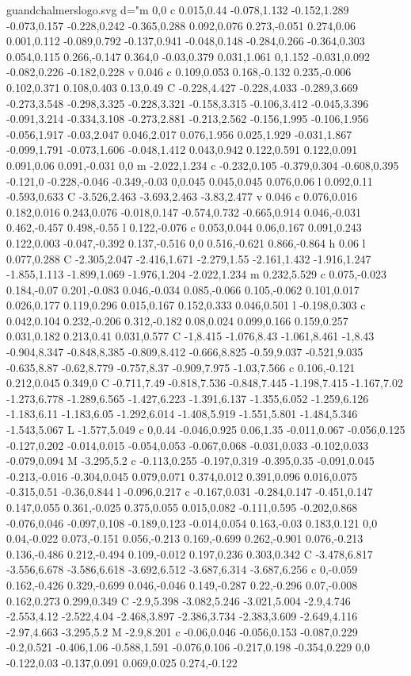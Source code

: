 \begin{filecontents}[noheader]{guandchalmerslogo.svg}
			   d="m 0,0 c 0.015,0.44 -0.078,1.132 -0.152,1.289 -0.073,0.157 -0.228,0.242 -0.365,0.288 0.092,0.076 0.273,-0.051 0.274,0.06 0.001,0.112 -0.089,0.792 -0.137,0.941 -0.048,0.148 -0.284,0.266 -0.364,0.303 0.054,0.115 0.266,-0.147 0.364,0 -0.03,0.379 0.031,1.061 0,1.152 -0.031,0.092 -0.082,0.226 -0.182,0.228 v 0.046 c 0.109,0.053 0.168,-0.132 0.235,-0.006 0.102,0.371 0.108,0.403 0.13,0.49 C -0.228,4.427 -0.228,4.033 -0.289,3.669 -0.273,3.548 -0.298,3.325 -0.228,3.321 -0.158,3.315 -0.106,3.412 -0.045,3.396 -0.091,3.214 -0.334,3.108 -0.273,2.881 -0.213,2.562 -0.156,1.995 -0.106,1.956 -0.056,1.917 -0.03,2.047 0.046,2.017 0.076,1.956 0.025,1.929 -0.031,1.867 -0.099,1.791 -0.073,1.606 -0.048,1.412 0.043,0.942 0.122,0.591 0.122,0.091 0.091,0.06 0.091,-0.031 0,0 m -2.022,1.234 c -0.232,0.105 -0.379,0.304 -0.608,0.395 -0.121,0 -0.228,-0.046 -0.349,-0.03 0,0.045 0.045,0.045 0.076,0.06 l 0.092,0.11 -0.593,0.633 C -3.526,2.463 -3.693,2.463 -3.83,2.477 v 0.046 c 0.076,0.016 0.182,0.016 0.243,0.076 -0.018,0.147 -0.574,0.732 -0.665,0.914 0.046,-0.031 0.462,-0.457 0.498,-0.55 l 0.122,-0.076 c 0.053,0.044 0.06,0.167 0.091,0.243 0.122,0.003 -0.047,-0.392 0.137,-0.516 0,0 0.516,-0.621 0.866,-0.864 h 0.06 l 0.077,0.288 C -2.305,2.047 -2.416,1.671 -2.279,1.55 -2.161,1.432 -1.916,1.247 -1.855,1.113 -1.899,1.069 -1.976,1.204 -2.022,1.234 m 0.232,5.529 c 0.075,-0.023 0.184,-0.07 0.201,-0.083 0.046,-0.034 0.085,-0.066 0.105,-0.062 0.101,0.017 0.026,0.177 0.119,0.296 0.015,0.167 0.152,0.333 0.046,0.501 l -0.198,0.303 c 0.042,0.104 0.232,-0.206 0.312,-0.182 0.08,0.024 0.099,0.166 0.159,0.257 0.031,0.182 0.213,0.41 0.031,0.577 C -1,8.415 -1.076,8.43 -1.061,8.461 -1,8.43 -0.904,8.347 -0.848,8.385 -0.809,8.412 -0.666,8.825 -0.59,9.037 -0.521,9.035 -0.635,8.87 -0.62,8.779 -0.757,8.37 -0.909,7.975 -1.03,7.566 c 0.106,-0.121 0.212,0.045 0.349,0 C -0.711,7.49 -0.818,7.536 -0.848,7.445 -1.198,7.415 -1.167,7.02 -1.273,6.778 -1.289,6.565 -1.427,6.223 -1.391,6.137 -1.355,6.052 -1.259,6.126 -1.183,6.11 -1.183,6.05 -1.292,6.014 -1.408,5.919 -1.551,5.801 -1.484,5.346 -1.543,5.067 L -1.577,5.049 c 0,0.44 -0.046,0.925 0.06,1.35 -0.011,0.067 -0.056,0.125 -0.127,0.202 -0.014,0.015 -0.054,0.053 -0.067,0.068 -0.031,0.033 -0.102,0.033 -0.079,0.094 M -3.295,5.2 c -0.113,0.255 -0.197,0.319 -0.395,0.35 -0.091,0.045 -0.213,-0.016 -0.304,0.045 0.079,0.071 0.374,0.012 0.391,0.096 0.016,0.075 -0.315,0.51 -0.36,0.844 l -0.096,0.217 c -0.167,0.031 -0.284,0.147 -0.451,0.147 0.147,0.055 0.361,-0.025 0.375,0.055 0.015,0.082 -0.111,0.595 -0.202,0.868 -0.076,0.046 -0.097,0.108 -0.189,0.123 -0.014,0.054 0.163,-0.03 0.183,0.121 0,0 0.04,-0.022 0.073,-0.151 0.056,-0.213 0.169,-0.699 0.262,-0.901 0.076,-0.213 0.136,-0.486 0.212,-0.494 0.109,-0.012 0.197,0.236 0.303,0.342 C -3.478,6.817 -3.556,6.678 -3.586,6.618 -3.692,6.512 -3.687,6.314 -3.687,6.256 c 0,-0.059 0.162,-0.426 0.329,-0.699 0.046,-0.046 0.149,-0.287 0.22,-0.296 0.07,-0.008 0.162,0.273 0.299,0.349 C -2.9,5.398 -3.082,5.246 -3.021,5.004 -2.9,4.746 -2.553,4.12 -2.522,4.04 -2.468,3.897 -2.386,3.734 -2.383,3.609 -2.649,4.116 -2.97,4.663 -3.295,5.2 M -2.9,8.201 c -0.06,0.046 -0.056,0.153 -0.087,0.229 -0.2,0.521 -0.406,1.06 -0.588,1.591 -0.076,0.106 -0.217,0.198 -0.354,0.229 0,0 -0.122,0.03 -0.137,0.091 0.069,0.025 0.274,-0.122 
\end{filecontents}
